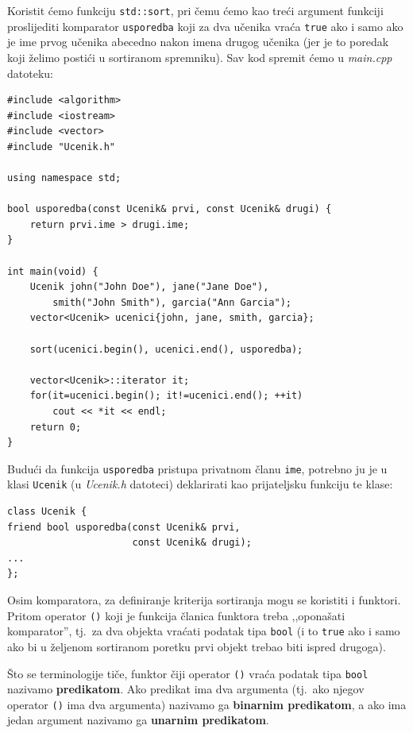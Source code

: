 \begin{rjesenje}
    Koristit ćemo funkciju \texttt{std::sort}, pri čemu ćemo kao treći argument
    funkciji proslijediti komparator \texttt{usporedba}
    koji za dva učenika vraća \texttt{true} ako i samo ako je ime prvog učenika
    abecedno nakon imena drugog učenika
    (jer je to poredak koji želimo postići u sortiranom spremniku).
    Sav kod spremit ćemo u \textit{main.cpp} datoteku:
    \begin{verbatim}
#include <algorithm>
#include <iostream>
#include <vector>
#include "Ucenik.h"

using namespace std;

bool usporedba(const Ucenik& prvi, const Ucenik& drugi) {
    return prvi.ime > drugi.ime;
}

int main(void) {
    Ucenik john("John Doe"), jane("Jane Doe"),
        smith("John Smith"), garcia("Ann Garcia");
    vector<Ucenik> ucenici{john, jane, smith, garcia};
    
    sort(ucenici.begin(), ucenici.end(), usporedba);
    
    vector<Ucenik>::iterator it;
    for(it=ucenici.begin(); it!=ucenici.end(); ++it)
        cout << *it << endl;
    return 0;
}
\end{verbatim}

Budući da funkcija \texttt{usporedba} pristupa privatnom članu \texttt{ime}, potrebno ju je u klasi \texttt{Ucenik}
(u \textit{Ucenik.h} datoteci) deklarirati kao prijateljsku funkciju te klase:
    \begin{verbatim}
class Ucenik {
friend bool usporedba(const Ucenik& prvi,
                      const Ucenik& drugi);
...
};
    \end{verbatim}
\end{rjesenje}


Osim komparatora, za definiranje kriterija sortiranja mogu se koristiti i funktori.
Pritom operator \texttt{()} koji je funkcija članica funktora
treba ,,oponašati komparator'', tj.\ za dva objekta vraćati podatak tipa \texttt{bool}
(i to \texttt{true} ako i samo ako bi u željenom sortiranom poretku prvi objekt
trebao biti ispred drugoga).
\medskip

Što se terminologije tiče, funktor čiji operator \texttt{()}
vraća podatak tipa \texttt{bool} nazivamo \textbf{predikatom}.
Ako predikat ima dva argumenta
(tj.\ ako njegov operator \texttt{()} ima dva argumenta)
nazivamo ga \textbf{binarnim predikatom}, a ako ima jedan argument nazivamo ga
\textbf{unarnim predikatom}.

